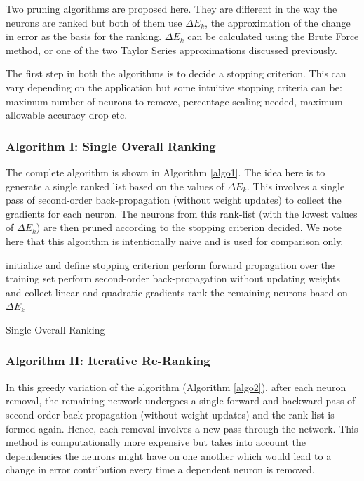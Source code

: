Two pruning algorithms are proposed here. They are different in the way the neurons are ranked but both of them use $\Delta E_{k}$, the approximation of the change in error as the basis for the ranking. $\Delta E_{k}$ can be calculated using the Brute Force method, or one of the two Taylor Series approximations discussed previously.

The first step in both the algorithms is to  decide a stopping criterion. This can vary depending on the application but some intuitive stopping criteria can be: maximum number of neurons to remove, percentage scaling needed, maximum allowable accuracy drop etc. 

\subsubsection{Algorithm I: Single Overall Ranking}
The complete algorithm is shown in Algorithm \ref{algo1}. The idea here is to generate a single ranked list based on the values of $\Delta E_{k}$. This involves a single pass of second-order back-propagation (without weight updates) to collect the gradients for each neuron. The neurons from this rank-list (with the lowest values of $\Delta E_{k}$) are then pruned according to the stopping criterion decided. We note here that this algorithm is intentionally naive and is used for comparison only. 

\begin{algorithm}
 initialize and define stopping criterion \;
 perform forward propagation over the training set \;
  perform second-order back-propagation without updating weights and collect linear and quadratic gradients \;
  rank the remaining neurons based on $\Delta E_{k}$\;
 \caption{Single Overall Ranking}
 \label{algo1}
\end{algorithm}
 
\subsubsection{Algorithm II: Iterative Re-Ranking}

In this greedy variation of the algorithm (Algorithm \ref{algo2}), after each neuron removal, the remaining network undergoes a single forward and backward pass of second-order back-propagation (without weight updates) and the rank list is formed again. Hence, each removal involves a new pass through the network. This method is computationally more expensive but takes into account the dependencies the neurons might have on one another which would lead to a change in error contribution every time a dependent neuron is removed. 

